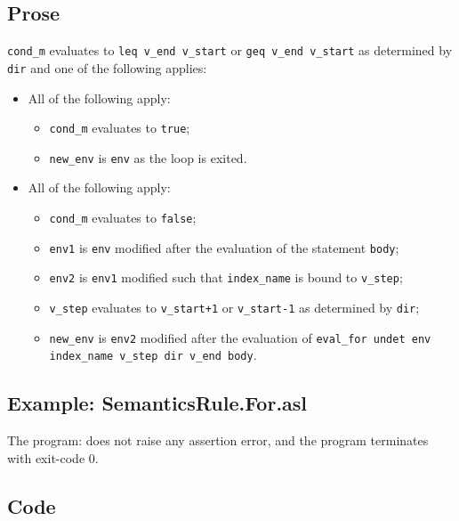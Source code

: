 \documentclass{book}
\begin{document}
    \subsection{Prose}
    \texttt{cond\_m} evaluates to \texttt{leq v\_end v\_start} or \texttt{geq
v\_end v\_start} as determined by \texttt{dir} and one of the following
applies:
    \begin{itemize}
    \item All of the following apply:
      \begin{itemize}
      \item \texttt{cond\_m} evaluates to \texttt{true};
      \item \texttt{new\_env} is \texttt{env} as the loop is exited.
      \end{itemize}
    \item All of the following apply:
      \begin{itemize}
      \item \texttt{cond\_m} evaluates to \texttt{false};
      \item \texttt{env1} is \texttt{env} modified after the evaluation of the statement \texttt{body};
      \item \texttt{env2} is \texttt{env1} modified such that \texttt{index\_name} is bound to \texttt{v\_step};
      \item \texttt{v\_step} evaluates to \texttt{v\_start+1} or \texttt{v\_start-1} as determined by \texttt{dir};
      \item \texttt{new\_env} is \texttt{env2} modified after the evaluation of \texttt{eval\_for undet
        env index\_name v\_step dir v\_end body}.
      \end{itemize}
    \end{itemize}

    \subsection{Example: SemanticsRule.For.asl}
    The program:
    does not raise any assertion error, and the program terminates with exit-code 0.

    \subsection{Code}
\end{document}
